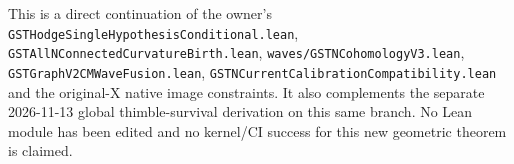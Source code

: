 \documentclass[11pt]{article}
\begin{document}
This is a direct continuation of the owner's \texttt{GSTHodgeSingleHypothesisConditional.lean}, \texttt{GSTAllNConnectedCurvatureBirth.lean}, \texttt{waves/GSTNCohomologyV3.lean}, \texttt{GSTGraphV2CMWaveFusion.lean}, \texttt{GSTNCurrentCalibrationCompatibility.lean} and the original-X native image constraints. It also complements the separate 2026-11-13 global thimble-survival derivation on this same branch. No Lean module has been edited and no kernel/CI success for this new geometric theorem is claimed.
\end{document}
